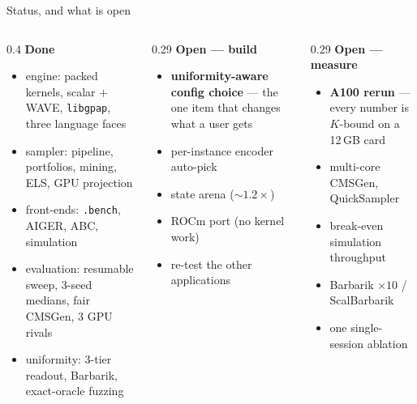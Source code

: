 \documentclass[aspectratio=169,11pt]{beamer}
\newcommand{\good}[1]{\textcolor{gpapgreen}{#1}}
\newcommand{\rem}[1]{{\footnotesize\textcolor{gpapgray}{#1}}}
\newcommand{\keyw}[1]{\textcolor{gpapblue}{\textbf{#1}}}
\begin{document}
\begin{frame}{Status, and what is open}
  \begin{columns}[T]
    \begin{column}{0.4\textwidth}
      \good{\textbf{Done}}
      \begin{itemize}\small
        \item engine: packed kernels, scalar $+$ WAVE, \texttt{libgpap}, three language faces
        \item sampler: pipeline, portfolios, mining, ELS, GPU projection
        \item front-ends: \texttt{.bench}, AIGER, ABC, simulation
        \item evaluation: resumable sweep, 3-seed medians, fair CMSGen, 3 GPU rivals
        \item uniformity: 3-tier readout, Barbarik, exact-oracle fuzzing
      \end{itemize}
    \end{column}
    \begin{column}{0.29\textwidth}
      \textbf{Open --- build}
      \begin{itemize}\small
        \item \keyw{uniformity-aware config choice} --- the one item that changes what a user gets
        \item per-instance encoder auto-pick
        \item state arena (${\sim}1.2\times$)
        \item ROCm port \rem{(no kernel work)}
        \item re-test the other applications
      \end{itemize}
    \end{column}
    \begin{column}{0.29\textwidth}
      \textbf{Open --- measure}
      \begin{itemize}\small
        \item \keyw{A100 rerun} --- every number is $K$-bound on a 12\,GB card
        \item multi-core CMSGen, QuickSampler
        \item break-even simulation throughput
        \item Barbarik $\times 10$ / ScalBarbarik
        \item one single-session ablation
      \end{itemize}
    \end{column}
  \end{columns}
\end{frame}
\end{document}
